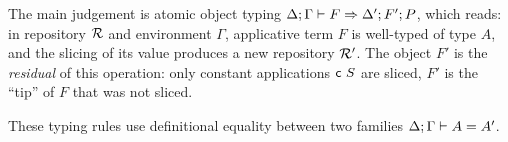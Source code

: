 \documentclass{llncs}
\begin{document}

The main judgement is atomic object typing ${{\Delta}; {\Gamma}}\vdash{{{F}}\Rightarrow{{\Delta'};{F'};{P}}}$, which reads: in repository $\mathcal{R}$ and environment
$\Gamma$, applicative term $F$ is well-typed of type $A$, and the
slicing of its value produces a new repository $\mathcal{R'}$. The object $F'$
is the \emph{residual} of this operation: only constant applications
${\text{\textsf{c}}}\  S$ are sliced, $F'$ is the ``tip'' of $F$ that was not
sliced.

These typing rules use definitional equality between two families
${{\Delta}; {\Gamma}}\vdash{{A}={A'}}$.










\end{document}
